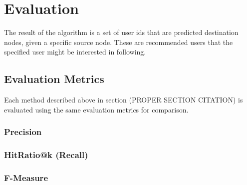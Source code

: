 
\chapter{Evaluation}

The result of the algorithm is a set of user ids that are predicted destination nodes, given a specific source node. These are recommended users that the specified user might be interested in following. 

\section{Evaluation Metrics}

Each method described above in section (PROPER SECTION CITATION) is evaluated using the same evaluation metrics for comparison.

\subsection{Precision}

\subsection{HitRatio@k (Recall)}

\subsection{F-Measure}


